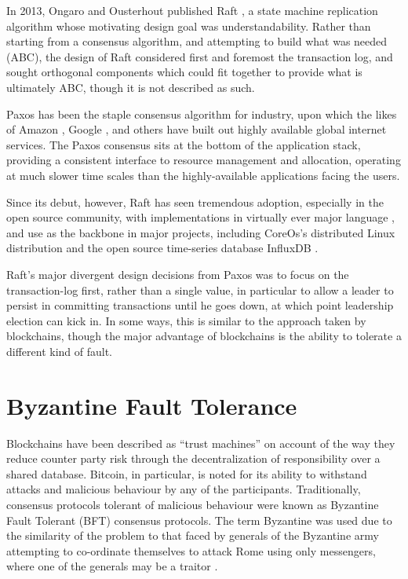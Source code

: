In 2013, Ongaro and Ousterhout published Raft \cite{raft},
a state machine replication algorithm whose motivating design goal was understandability.
Rather than starting from a consensus algorithm, and attempting to build what was needed (ABC),
the design of Raft considered first and foremost the transaction log,
and sought orthogonal components which could fit together to provide what is ultimately ABC,
though it is not described as such.

Paxos has been the staple consensus algorithm for industry, 
upon which the likes of Amazon \cite{dynamo}, Google \cite{chubby}, 
and others have built out highly available global internet services.
The Paxos consensus sits at the bottom of the application stack, 
providing a consistent interface to resource management and allocation, 
operating at much slower time scales than the highly-available applications facing the users.

Since its debut, however, Raft has seen tremendous adoption, especially in the open source community,
with implementations in virtually ever major language \cite{raft.github.io},
and use as the backbone in major projects, 
including CoreOs's distributed Linux distribution \cite{coreos_raft} 
and the open source time-series database InfluxDB \cite{influxdb,hashicorp_raft}.

Raft's major divergent design decisions from Paxos was to 
focus on the transaction-log first, rather than a single value,
in particular to allow a leader to persist in committing transactions until he goes down, 
at which point leadership election can kick in. 
In some ways, this is similar to the approach taken by blockchains, 
though the major advantage of blockchains is the ability to tolerate a different kind of fault.

\section{Byzantine Fault Tolerance}

Blockchains have been described as ``trust machines'' \cite{economist_blockchains} on account of the way they reduce counter party risk through the decentralization of responsibility over a shared database.
Bitcoin, in particular, is noted for its ability to withstand attacks and malicious behaviour by any of the participants. 
Traditionally, consensus protocols tolerant of malicious behaviour were known as Byzantine Fault Tolerant (BFT) consensus protocols.
The term Byzantine was used due to the similarity of the problem to that faced by generals of the Byzantine army attempting to co-ordinate themselves to attack Rome using only messengers,
where one of the generals may be a traitor \cite{lamport1982byzantine}.

